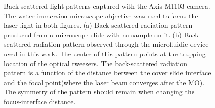 \documentclass[letterpaper,12pt,oneside]{book}
\begin{document}
\begin{figure}[H]
    \centering
    \qquad
    \caption{Back-scattered light patterns captured with the Axis M1103 camera. The water immersion microscope objective was used to focus the laser light in both figures.  (a) Back-scattered radiation pattern produced from a microscope slide with no sample on it.  (b) Back-scattered radiation pattern observed through the microfluidic device used in this work. The centre of this pattern points at the trapping location of the optical tweezers. The back-scattered radiation pattern is a function of the distance between the cover slide interface and the focal point(where the laser beam converges after the MO). The symmetry of the pattern should remain when changing the focus-interface distance.   }%
    \label{symmetricpattern}%
\end{figure}
\end{document}
